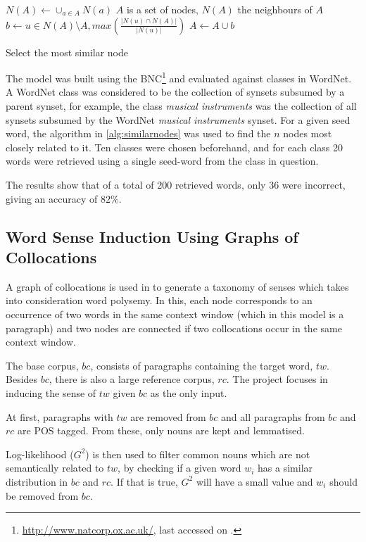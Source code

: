 \begin{algorithm}
 \begin{algorithmic}
  \State $N(A) \gets \cup_{a \in A} N(a)$
  \Comment $A$ is a set of nodes, $N(A)$ the neighbours of $A$
  \State $b \gets u \in N(A) \setminus A, max(\frac{|N(u) \cap N(A)|}{|N(u)|})$
  \State $A \gets A \cup b$
 \end{algorithmic}
 \caption{\label{alg:similarnodes} Select the most similar node}
\end{algorithm}

The model was built using the 
\ac{BNC}\footnote{\url{http://www.natcorp.ox.ac.uk/}, last accessed on 
.} and evaluated against classes in WordNet. A WordNet 
class was considered to be the collection of synsets subsumed by a parent 
synset, for example, the class \textit{musical instruments} was the collection 
of all synsets subsumed by the WordNet \textit{musical instruments} synset. For 
a given seed word, the algorithm in \ref{alg:similarnodes} was used 
to find the $n$ nodes most closely related to it. Ten classes were chosen 
beforehand, and for each class 20 words were retrieved using a single seed-word 
from the class in question.

The results show that of a total of 200 retrieved words, only 36 were
incorrect, giving an accuracy of $82\%$.

\subsection{Word Sense Induction Using Graphs of Collocations}
\label{sec:collocations}

A graph of collocations is used in \citep{klapaftis2008word} to generate a
taxonomy of senses which takes into consideration word polysemy. In this, each
node corresponds to an occurrence of two words in the same context window (which
in this model is a paragraph) and two nodes are connected if two collocations
occur in the same context window.

The base corpus, $bc$, consists of paragraphs containing the target word, $tw$.
Besides $bc$, there is also a large reference corpus, $rc$. The project focuses
in inducing the sense of $tw$ given $bc$ as the only input.

At first, paragraphs with $tw$ are removed from $bc$ and all paragraphs from
$bc$ and $rc$ are \ac{POS} tagged. From these, only nouns are kept and
lemmatised.

Log-likelihood ($G^2$) \citep{dunning1993accurate} is then used to filter 
common nouns which are not semantically related to $tw$, by checking if a given 
word $w_i$ has a similar distribution in $bc$ and $rc$. If that is true, $G^2$ 
will have a small value and $w_i$ should be removed from $bc$.

